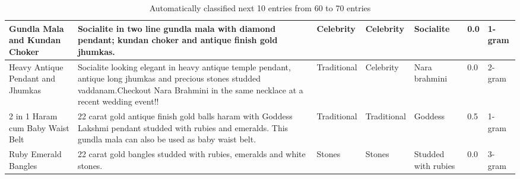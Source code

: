 \begin{table}
\begin{tabular}{ | p{2.3cm} | p{4.4cm} | p{1.5cm} | p{1.5cm} | p{2.0cm}|p{1.3cm}|p{1.3cm}|}
\hline
Gundla Mala and Kundan Choker & Socialite in two line gundla mala with diamond pendant; kundan choker and antique finish gold jhumkas. & Celebrity & Celebrity & Socialite & 0.0 & 1-gram \\
\hline
Heavy Antique Pendant and Jhumkas & Socialite looking elegant in heavy antique temple pendant, antique long jhumkas and precious stones studded vaddanam.Checkout Nara Brahmini in the same necklace at a recent wedding event!! & Traditional & Celebrity & Nara brahmini & 0.0 & 2-gram\\
\hline
2 in 1 Haram cum Baby Waist Belt & 22 carat gold antique finish gold balls haram with Goddess Lakshmi pendant studded with rubies and emeralds. This gundla mala can also be used as baby waist belt. & Traditional & Traditional & Goddess & 0.5 & 1-gram\\
\hline
Ruby Emerald Bangles & 22 carat gold bangles studded with rubies, emeralds and white stones. & Stones & Stones & Studded with rubies & 0.0 & 3-gram\\
\hline
\end{tabular}
\caption{Automatically classified next 10 entries from 60 to 70 entries }
\label{table:q2-4}
\end{table}

